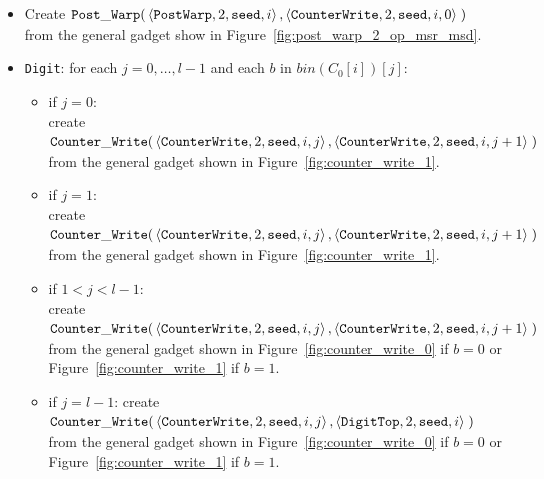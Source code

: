 \begin{itemize}
    \item Create
    $\begin{aligned}[t]
        {\tt Post\_Warp}(&\left\langle {\tt PostWarp}, 2, {\tt seed}, i    \right\rangle,
                   \left\langle {\tt CounterWrite},    2, {\tt seed}, i, 0 \right\rangle \;)
    \end{aligned}$\\ from the general gadget show in Figure~\ref{fig:post_warp_2_op_msr_msd}.


    \item {\tt Digit}: for each $j=0,\ldots,l-1$ and each $b$ in $bin(C_0[i])[j]$:
    \begin{itemize}
        \item if $j = 0$:\\ create
        $\begin{aligned}[t]
            {\tt Counter\_Write}(&\left\langle {\tt CounterWrite}, 2, {\tt seed}, i, j \right\rangle, \left\langle {\tt CounterWrite}, 2, {\tt seed}, i, j + 1 \right\rangle \;)
        \end{aligned}$\\from the general gadget shown in Figure~\ref{fig:counter_write_1}.

        \item if $j = 1$:\\ create
        $\begin{aligned}[t]
            {\tt Counter\_Write}(&\left\langle {\tt CounterWrite}, 2, {\tt seed}, i, j \right\rangle, \left\langle {\tt CounterWrite}, 2, {\tt seed}, i, j + 1 \right\rangle \;)
        \end{aligned}$\\from the general gadget shown in Figure~\ref{fig:counter_write_1}.

        \item if $1 < j < l-1$:\\ create
        $\begin{aligned}[t]
            {\tt Counter\_Write}(&\left\langle {\tt CounterWrite}, 2, {\tt seed}, i, j \right\rangle, \left\langle {\tt CounterWrite}, 2, {\tt seed}, i, j + 1 \right\rangle \;)
        \end{aligned}$\\from the general gadget shown in Figure~\ref{fig:counter_write_0} if $b = 0$ or Figure~\ref{fig:counter_write_1} if $b = 1$.

        \item if $j = l-1$: create
        $\begin{aligned}[t]
            {\tt Counter\_Write}(&\left\langle {\tt CounterWrite}, 2, {\tt seed}, i, j \right\rangle, \left\langle {\tt DigitTop}, 2, {\tt seed}, i \right\rangle \;)
        \end{aligned}$\\from the general gadget shown in Figure~\ref{fig:counter_write_0} if $b = 0$ or Figure~\ref{fig:counter_write_1} if $b = 1$.
    \end{itemize}


\end{itemize}
